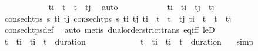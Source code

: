 \begin{isabellebody}
\ \ \ \ \ \ \ \ \ \ \isamarkupfalse%
\ {\isacartoucheopen}t\isactrlsub i{\isacharprime}{\kern0pt}\ {\isacharless}{\kern0pt}\ t\ {\isasymand}\ t\ {\isacharless}{\kern0pt}\ t\isactrlsub j{\isacharprime}{\kern0pt}{\isacartoucheclose}\ \isamarkupfalse%
\ auto\isanewline
\ \ \ \ \ \ \ \ \isamarkupfalse%
\ \isamarkupfalse%
\ {\isachardoublequoteopen}t\isactrlsub i{\isacharprime}{\kern0pt}\ {\isacharequal}{\kern0pt}\ t\isactrlsub i{\isachardoublequoteclose}\ \ {\isachardoublequoteopen}t\isactrlsub j{\isacharprime}{\kern0pt}\ {\isacharequal}{\kern0pt}\ t\isactrlsub j{\isachardoublequoteclose}\isanewline
\ \ \ \ \ \ \ \ \ \ \isamarkupfalse%
\ {\isacartoucheopen}consec{\isacharunderscore}{\kern0pt}htps\ {\isasympi}s\ t\isactrlsub i\ t\isactrlsub j{\isacartoucheclose}\ {\isacartoucheopen}consec{\isacharunderscore}{\kern0pt}htps\ {\isasympi}s\ t\isactrlsub i{\isacharprime}{\kern0pt}\ t\isactrlsub j{\isacharprime}{\kern0pt}{\isacartoucheclose}\ {\isacartoucheopen}t\isactrlsub i\ {\isacharless}{\kern0pt}\ t\ {\isasymand}\ t\ {\isacharless}{\kern0pt}\ t\isactrlsub j{\isacartoucheclose}\ {\isacartoucheopen}t\isactrlsub i{\isacharprime}{\kern0pt}\ {\isacharless}{\kern0pt}\ t\ {\isasymand}\ t\ {\isacharless}{\kern0pt}\ t\isactrlsub j{\isacharprime}{\kern0pt}{\isacartoucheclose}\ \isanewline
\ \ \ \ \ \ \ \ \ \ \isamarkupfalse%
\ consec{\isacharunderscore}{\kern0pt}htps{\isacharunderscore}{\kern0pt}def\ \isamarkupfalse%
\ auto\ {\isacharparenleft}{\kern0pt}metis\ dual{\isacharunderscore}{\kern0pt}order{\isachardot}{\kern0pt}strict{\isacharunderscore}{\kern0pt}trans\ eq{\isacharunderscore}{\kern0pt}iff\ leD{\isacharparenright}{\kern0pt}{\isacharplus}{\kern0pt}\isanewline
\ \ \ \ \ \ \ \ \isamarkupfalse%
\ \isamarkupfalse%
\ {\isachardoublequoteopen}t\isactrlsub {\isasympi}\ {\isasymle}\ t\isactrlsub i\ {\isasymand}\ t\isactrlsub i\ {\isacharless}{\kern0pt}\ t\isactrlsub {\isasympi}\ {\isacharplus}{\kern0pt}\ duration\ {\isasympi}{\isachardoublequoteclose}\isanewline
\ \ \ \ \ \ \ \ \ \ \isamarkupfalse%
\ {\isacartoucheopen}t\isactrlsub {\isasympi}\ {\isasymle}\ t\isactrlsub i{\isacharprime}{\kern0pt}\ {\isasymand}\ t\isactrlsub i{\isacharprime}{\kern0pt}\ {\isacharless}{\kern0pt}\ t\isactrlsub {\isasympi}\ {\isacharplus}{\kern0pt}\ duration\ {\isasympi}{\isacartoucheclose}\ \isamarkupfalse%
\ simp\isanewline
\ \ \ \ \ \ \ \ \isamarkupfalse%

\end{isabellebody}
